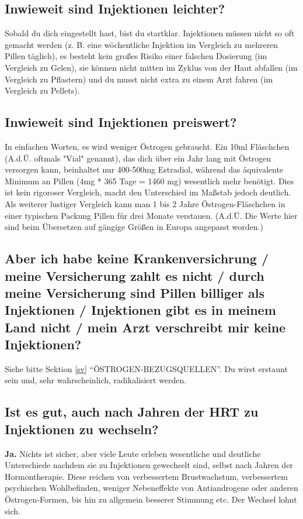 \documentclass{article}
\begin{document}
{\subsection{Inwieweit sind Injektionen leichter?}

Sobald du dich eingestellt hast, bist du startklar. Injektionen müssen nicht so oft gemacht werden (z. B. eine wöchentliche Injektion im Vergleich zu mehreren Pillen täglich), es besteht kein großes Risiko einer falschen Dosierung (im Vergleich zu Gelen), sie können nicht mitten im Zyklus von der Haut abfallen (im Vergleich zu Pflastern) und du musst nicht extra zu einem Arzt fahren (im Vergleich zu Pellets).

\subsection{Inwieweit sind Injektionen preiswert?}

In einfachen Worten, es wird weniger Östrogen gebraucht. Ein 10ml Fläschchen (A.d.Ü. oftmals "Vial" genannt), das dich über ein Jahr lang mit Östrogen versorgen kann, beinhaltet nur 400-500mg Estradiol, während das äquivalente Minimum an Pillen (4mg * 365 Tage = 1460 mg) wesentlich mehr benötigt. Dies ist kein rigoroser Vergleich, macht den Unterschied im Maßstab jedoch deutlich. Als weiterer lustiger Vergleich kann man 1 bis 2 Jahre Östrogen-Fläschchen in einer typischen Packung Pillen für drei Monate verstauen. (A.d.Ü. Die Werte hier sind beim Übersetzen auf gängige Größen in Europa angepasst worden.)

\subsection{Aber ich habe keine Krankenversichrung / meine Versicherung zahlt es nicht / durch meine Versicherung sind Pillen billiger als Injektionen / Injektionen gibt es in meinem Land nicht / mein Arzt verschreibt mir keine Injektionen?}

Siehe bitte Sektion \ref{sv} “ÖSTROGEN-BEZUGSQUELLEN”. Du wirst erstaunt sein und, sehr wahrscheinlich, radikalisiert werden.

\subsection{Ist es gut, auch nach Jahren der HRT zu Injektionen zu wechseln?}

\textbf{Ja.} Nichts ist sicher, aber viele Leute erleben wesentliche und deutliche Unterschiede nachdem sie zu Injektionen gewechselt sind, selbst nach Jahren der Hormontherapie. Diese reichen von verbessertem Brustwachstum, verbessertem psychischen Wohlbefinden, weniger Nebeneffekte von Antiandrogene oder anderen Östrogen-Formen, bis hin zu allgemein besserer Stimmung etc. Der Wechsel lohnt sich.

}
\end{document}
